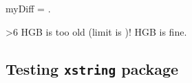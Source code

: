 \documentclass[german,notitlepage,smartquotes,noUpdateCheck]{hgbreport}
\begin{document}

\newcount\myDiff
{}

\noindent
myDiff = \the\myDiff.

\noindent
\ifnum\myDiff>6
    HGB is too old (limit is )!%
\else
    HGB is fine.%
\fi


\subsection*{Testing \texttt{xstring} package}


\expanded{\YYYY-}



\end{document}

